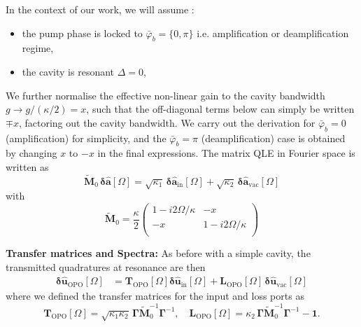 In the context of our work, we will assume : 
\begin{itemize}
  \item the pump phase is locked to $\bar{\varphi}_b = \{0,\pi\}$ i.e. amplification or deamplification regime,  
  \item the cavity is resonant $\Delta=0$,
\end{itemize}
We further normalise the effective non-linear gain to the cavity bandwidth $g \rightarrow g/(\kappa/2) = x$, such that the off-diagonal terms below can simply be written $\mp x$, factoring out the cavity bandwidth. We carry out the derivation for $\bar \varphi_b = 0$ (amplification) for simplicity, and the $\bar \varphi_b = \pi$ (deamplification) case is obtained by changing $x$ to $-x$ in the final expressions. The matrix QLE in Fourier space is written as
\begin{equation}
     \tilde{\mathbf{M}}_0 \,  \mathbf{\delta \hat{a}}[\Omega]  = \sqrt{\kappa_{\mathrm{1}}} \, \mathbf{\delta \hat{a}_{\mathrm{in}}}[\Omega]  + \sqrt{\kappa_2} \, \mathbf{\delta \hat{a}_{\mathrm{vac}}}[\Omega]  
\end{equation}
with 
\begin{equation*}
  \tilde{\mathbf{M}}_0 = \frac{\kappa}{2}\begin{pmatrix}
  1-i2\Omega/\kappa & - x\\ 
  - x  & 1-i2\Omega/\kappa\\ 
  \end{pmatrix} 
\end{equation*}

\noindent \textbf{Transfer matrices and Spectra: }
As before with a simple cavity, the transmitted quadratures at resonance are then 
\begin{equation}
\begin{split}
  \mathbf{\delta \hat{u}_{\mathrm{OPO}}}[\Omega] & =  \mathbf{T}_{\mathrm{OPO}}[\Omega] \mathbf{\delta \hat{u}_{\mathrm{in}}}[\Omega] +  \mathbf{L}_{\mathrm{OPO}}[\Omega] \, \mathbf{\delta \hat{u}_{\mathrm{vac}}}[\Omega] 
\end{split}
\end{equation}
where we defined the transfer matrices for the input and loss ports as
\begin{equation*}
  \mathbf{T}_{\mathrm{OPO}}[\Omega]=  \sqrt{\kappa_1 \kappa_2 } \,\mathbf{\Gamma}  \tilde{\mathbf{M}}^{-1}_0 \mathbf{\Gamma}^{-1}, \quad \mathbf{L}_{\mathrm{OPO}}[\Omega]=  \kappa_2 \,\mathbf{\Gamma}  \tilde{\mathbf{M}}^{-1}_0 \mathbf{\Gamma}^{-1}- \mathbf{1}.
\end{equation*}

